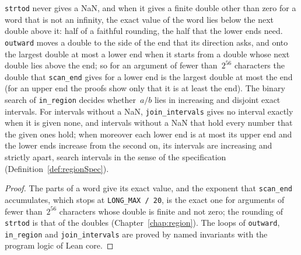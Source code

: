 \begin{lemma}\label{lem:cliNumbers}
  \leanok
  \verb|strtod| never gives a NaN, and when it gives a finite double other than zero for a word that
  is not an infinity, the exact value of the word lies below the next double above it: half of a
  faithful rounding, the half that the lower ends need. \verb|outward| moves a double to the side
  of the end that its direction asks, and onto the largest double at most a lower end when it starts
  from a double whose next double lies above the end; so for an argument of fewer than~$2^{56}$
  characters the double that \verb|scan_end| gives for a lower end is the largest double at most the
  end (for an upper end the proofs show only that it is at least the end). The binary search of
  \verb|in_region| decides whether~$a/b$ lies in increasing and disjoint exact intervals. For
  intervals without a NaN, \verb|join_intervals| gives no interval exactly when it is given none,
  and intervals without a NaN that hold every number that the given ones hold; when moreover each
  lower end is at most its upper end and the lower ends increase from the second on, its intervals
  are increasing and strictly apart, search intervals in the sense of the specification
  (Definition~\ref{def:regionSpec}).
\end{lemma}

\begin{proof}
  \leanok
  The parts of a word give its exact value, and the exponent that \verb|scan_end| accumulates, which
  stops at \verb|LONG_MAX / 20|, is the exact one for arguments of fewer than~$2^{56}$ characters
  whose double is finite and not zero; the rounding of \verb|strtod| is that of the doubles
  (Chapter~\ref{chap:region}). The loops of \verb|outward|, \verb|in_region| and
  \verb|join_intervals| are proved by named invariants with the program logic of Lean core.
\end{proof}

